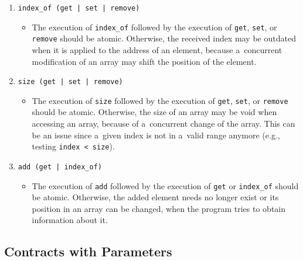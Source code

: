 \begin{example}
\begin{enumerate}[label={$ (\varrho_{\arabic*}) $}]
        \item
            \texttt{index\_of (get | set | remove)}
            \begin{itemize}[label=]
                \item
                    The execution of \texttt{index\_of} followed by the
                    execution of \texttt{get}, \texttt{set}, or 
                    \texttt{remove} should be atomic. Otherwise, the received
                    index may be outdated when it is applied to the address
                    of an element, because a~concurrent modification of an 
                    array may shift the position of the element.
            \end{itemize}

        \item
            \texttt{size (get | set | remove)}
            \begin{itemize}[label=]
                \item
                    The execution of \texttt{size} followed by the execution of
                    \texttt{get}, \texttt{set}, or \texttt{remove} should be
                    atomic. Otherwise, the size of an array may be void when
                    accessing an array, because of a~concurrent change of the
                    array. This can be an issue since a~given index is not in
                    a~valid range anymore (e.g., testing \texttt{index < size}).
            \end{itemize}

        \item
            \texttt{add (get | index\_of)}
            \begin{itemize}[label=]
                \item
                    The execution of \texttt{add} followed by the execution of
                    \texttt{get} or \texttt{index\_of} should be atomic.
                    Otherwise, the added element needs no longer exist or its
                    position in an array can be changed, when the program
                    tries to obtain information about it.
            \end{itemize}
    \end{enumerate}
\end{example}


\subsection{Contracts with Parameters}
\label{sec:paramContracts}

